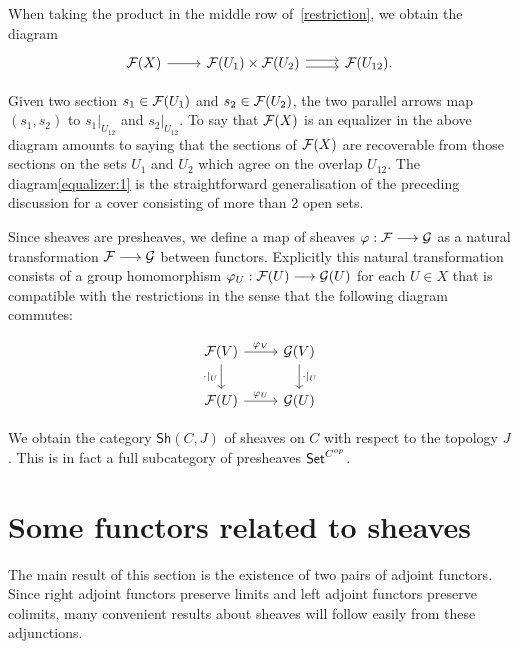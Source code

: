 When taking the product in the middle row of~\ref{restriction}, we obtain the diagram 
\[
	\begin{tikzcd}
		{\Sh{F}(X)} & {\Sh{F}(U_1)\times\Sh{F}(U_2)} & {\Sh{F}(U_{12})}.
		\arrow[from=1-1, to=1-2]
		\arrow[shift right=1, from=1-2, to=1-3]
		\arrow[shift left=1, from=1-2, to=1-3]
	\end{tikzcd}
\]

Given two section $s_1 \in \mathcal{F}(U_1)$ and $s_2 \in \mathcal{F}(U_2)$, the two parallel arrows map $(s_1, s_2)$ to $s_1|_{U_{12}}$ and $s_2|_{U_{12}}$. To say that $\mathcal{F}(X)$ is an equalizer in the above diagram amounts to saying that the sections of $\mathcal{F}(X)$ are recoverable from those sections on the sets $U_1$ and $U_2$ which agree on the overlap $U_{12}$. The diagram\eqref{equalizer:1} is the straightforward generalisation of the preceding discussion for a cover consisting of more than 2 open sets.

Since sheaves are presheaves, we define a map of sheaves $\varphi: \mathcal{F} \longrightarrow \mathcal{G}$ as a natural transformation $\mathcal{F} \longrightarrow \mathcal{G}$ between functors. Explicitly this natural transformation consists of a group homomorphism $\varphi_U: \mathcal{F}(U) \longrightarrow \mathcal{G}(U)$ for each $U \in X$ that is compatible with the restrictions in the sense that the following diagram commutes:

\[\begin{tikzcd}
	{\Sh{F}(V)} & {\Sh{G}(V)} \\
	{\Sh{F}(U)} & {\Sh{G}(U)}
	\arrow["{\cdot|_U}"', from=1-1, to=2-1]
	\arrow["{\varphi_V}", from=1-1, to=1-2]
	\arrow["{\cdot|_U}", from=1-2, to=2-2]
	\arrow["{\varphi_U}", from=2-1, to=2-2]
\end{tikzcd}\]


We obtain the category $\mathsf{Sh}(C,J)$ of sheaves on $C$ with respect to the topology $J$. This is in fact a full subcategory of presheaves $\mathsf{Set}^{C^{op}}$.

\section{Some functors related to sheaves}
The main result of this section is the existence of two pairs of adjoint functors. Since right adjoint functors preserve limits and left adjoint functors preserve colimits, many convenient results about sheaves will follow easily from these adjunctions.

